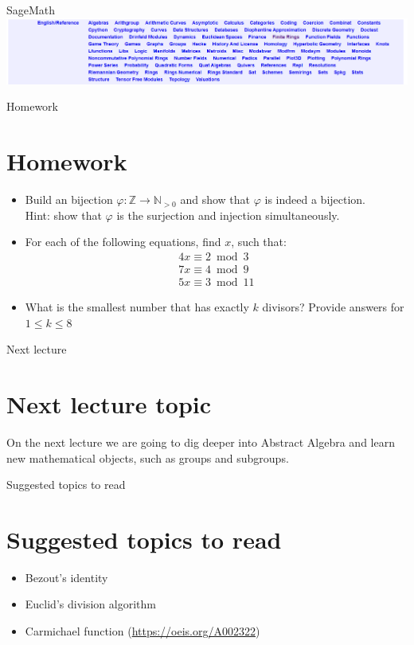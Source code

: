 \documentclass{beamer}
\begin{document}
\begin{frame}{SageMath}
    \includegraphics[width=\linewidth]{fig/sagemath.png}
\end{frame}

\begin{frame}{Homework}
    \section{Homework}
    \begin{itemize}
        \item Build an bijection $\varphi : \mathbb{Z} \to \mathbb{N}_{>0}$ and 
        show that $\varphi$ is indeed a bijection. \\ 
        Hint: show that $\varphi$ is the surjection and injection simultaneously.
        \item For each of the following equations, find $x$, such that:
        \begin{eqnarray*}
            4x \equiv 2 \bmod 3 \\
            7x \equiv 4 \bmod 9 \\
            5x \equiv 3 \bmod 11
        \end{eqnarray*}
        \item What is the smallest number that has exactly $k$ divisors?
        Provide answers for $1 \le k \le 8$
    \end{itemize}
\end{frame}

\begin{frame}{Next lecture}
    \section{Next lecture topic}
    On the next lecture we are going to dig deeper into Abstract Algebra and 
    learn new mathematical objects, such as groups and subgroups.
\end{frame}

\begin{frame}{Suggested topics to read}
    \section{Suggested topics to read}
    \begin{itemize}
        \item Bezout's identity
        \item Euclid's division algorithm
        \item Carmichael function (\url{https://oeis.org/A002322})
    \end{itemize}    
\end{frame}
\end{document}
